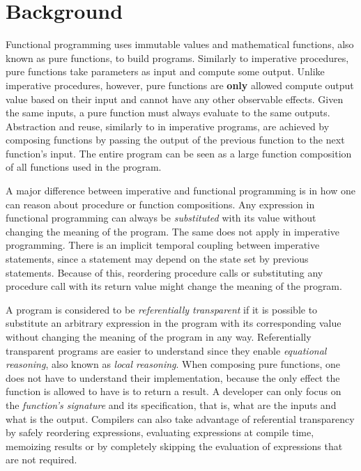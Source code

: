 \chapter{Background} \label{Background}

Functional programming uses immutable values and mathematical functions, also known as pure functions, to build programs. Similarly to imperative procedures, pure functions take parameters as input and compute some output. Unlike imperative procedures, however, pure functions are \textbf{only} allowed compute output value based on their input and cannot have any other observable effects. Given the same inputs, a pure function must always evaluate to the same outputs. Abstraction and reuse, similarly to in imperative programs, are achieved by composing functions by passing the output of the previous function to the next function's input. The entire program can be seen as a large function composition of all functions used in the program.

A major difference between imperative and functional programming is in how one can reason about procedure or function compositions. Any expression in functional programming can always be \emph{substituted} with its value without changing the meaning of the program. The same does not apply in imperative programming. There is an implicit temporal coupling between imperative statements, since a statement may depend on the state set by previous statements. Because of this, reordering procedure calls or substituting any procedure call with its return value might change the meaning of the program.~\cite[Chapter~1]{sicp}

A program is considered to be \emph{referentially transparent} if it is possible to substitute an arbitrary expression in the program with its corresponding value without changing the meaning of the program in any way. Referentially transparent programs are easier to understand since they enable \emph{equational reasoning}, also known as \emph{local reasoning}. When composing pure functions, one does not have to understand their implementation, because the only effect the function is allowed to have is to return a result. A developer can only focus on the \emph{function's signature} and its specification, that is, what are the inputs and what is the output. Compilers can also take advantage of referential transparency by safely reordering expressions, evaluating expressions at compile time, memoizing results or by completely skipping the evaluation of expressions that are not required.

